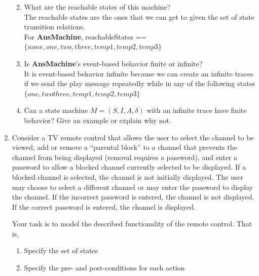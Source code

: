 \documentclass{article}
\begin{document}
\begin{enumerate}
\begin{enumerate}
\begin{enumerate}
   \end{enumerate}
 \item What are the reachable states of this machine? \\
   The reachable states are the ones that we can get to given the set of state transition relations. \\
   For {\bf AnsMachine}, reachableStates == $\{none, one, two, three, temp1, temp2, temp3 \}$ \\
\item Is {\bf AnsMachine}'s event-based behavior finite or
  infinite?\\
  It is event-based behavior infinite because
  we can create an infinite traces if we send
  the play message repeatedly while in any of the following states
  $\{one, two three, temp1, temp2, temp3\}$ \\
 \item Can a state machine $M=(S,I,A,\delta)$ with an infinite trace have finite
behavior? Give an example or explain why not.
\end{enumerate}

\item Consider a TV remote control that allows the user to select
the channel to be viewed, add or remove a ``parental block'' to a
channel that prevents the channel from being displayed (removal
requires a password), and enter a password to allow a blocked
channel currently selected to be displayed. If a blocked channel
is selected, the channel is not initially displayed. The user may
choose to select a different channel or may enter the password to
display the channel. If the incorrect password is entered, the
channel is not displayed. If the correct password is entered, the
channel is displayed.

Your task is to model the described functionality of the remote control. That is,
\begin{enumerate}
\item Specify the set of states

\item Specify the pre- and post-conditions for each action
\end{enumerate}


\end{enumerate}
\end{document}
